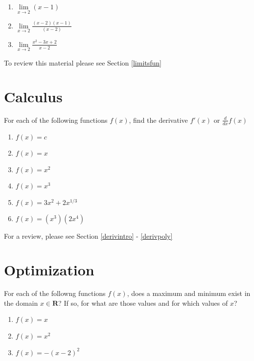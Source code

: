 \documentclass[
]{book}
\providecommand{\tightlist}{%
  \setlength{\itemsep}{0pt}\setlength{\parskip}{0pt}}
\theoremstyle{definition}
\theoremstyle{definition}
\theoremstyle{definition}
\theoremstyle{definition}
\theoremstyle{remark}
\begin{document}
\begin{enumerate}
\def\labelenumi{\arabic{enumi}.}
\tightlist
\item
  \(\lim\limits_{x \to 2} (x - 1)\)
\item
  \(\lim\limits_{x \to 2} \frac{(x - 2) (x - 1)}{(x - 2)}\)
\item
  \(\lim\limits_{x \to 2}\frac{x^2 - 3x + 2}{x- 2}\)
\end{enumerate}

To review this material please see Section \ref{limitsfun}

\hypertarget{calculus}{%
\section*{Calculus}\label{calculus}}

For each of the following functions \(f(x)\), find the derivative \(f'(x)\) or \(\frac{d}{dx}f(x)\)

\begin{enumerate}
\def\labelenumi{\arabic{enumi}.}
\tightlist
\item
  \(f(x)=c\)
\item
  \(f(x)=x\)
\item
  \(f(x)=x^2\)
\item
  \(f(x)=x^3\)
\item
  \(f(x)=3x^2+2x^{1/3}\)
\item
  \(f(x)=(x^3)(2x^4)\)
\end{enumerate}

For a review, please see Section \ref{derivintro} - \ref{derivpoly}

\hypertarget{optimization}{%
\section*{Optimization}\label{optimization}}

For each of the followng functions \(f(x)\), does a maximum and minimum exist in the domain \(x \in \mathbf{R}\)? If so, for what are those values and for which values of \(x\)?

\begin{enumerate}
\def\labelenumi{\arabic{enumi}.}
\tightlist
\item
  \(f(x) = x\)
\item
  \(f(x) = x^2\)
\item
  \(f(x) = -(x - 2)^2\)
\end{enumerate}
\end{document}

